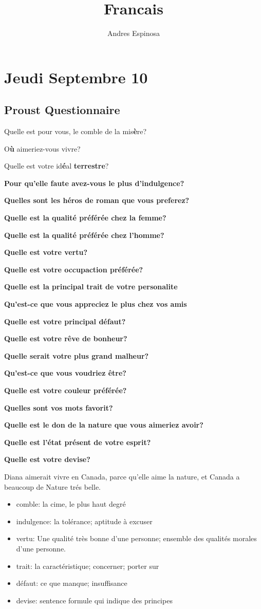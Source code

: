 \documentclass[11pt]{article}
\title{Francais}
\author{Andres Espinosa}
\begin{document}
\pgfplotsset{compat=1.18}
\maketitle

\tableofcontents
\section{Jeudi Septembre 10}
\subsection{Proust Questionnaire}

Quelle est pour vous, le comble de la mis\textbf{è}re?

O\textbf{ù} aimeriez-vous vivre?

Quelle est votre id\textbf{é}al \textbf{terrestre}?

\textbf{Pour qu'elle faute avez-vous le plus d'indulgence?}

\textbf{Quelles sont les héros de roman que vous preferez?}

\textbf{Quelle est la qualité préférée chez la femme?}

\textbf{Quelle est la qualité préférée chez l'homme?}

\textbf{Quelle est votre vertu?}

\textbf{Quelle est votre occupaction préférée?}

\textbf{Quelle est la principal trait de votre personalite} 

\textbf{Qu'est-ce que vous appreciez le plus chez vos amis} 

\textbf{Quelle est votre principal défaut?}

\textbf{Quelle est votre rêve de bonheur?}

\textbf{Quelle serait votre plus grand malheur?}

\textbf{Qu'est-ce que vous voudriez être?}

\textbf{Quelle est votre couleur préférée?}

\textbf{Quelles sont vos mots favorit?}

\textbf{Quelle est le don de la nature que vous aimeriez avoir?}

\textbf{Quelle est l'état présent de votre esprit?}

\textbf{Quelle est votre devise?}

Diana aimerait vivre en Canada, parce qu'elle aime la nature, et Canada a beaucoup de Nature trés belle.

\begin{itemize}
  \item comble: la cime, le plus haut degré
  \item indulgence: la tolérance; aptitude à excuser
  \item vertu: Une qualité très bonne d'une personne; ensemble des qualités morales d'une personne.
  \item trait: la caractéristique; concerner; porter sur
  \item défaut: ce que manque; insuffisance
  \item devise: sentence formule qui indique des principes
\end{itemize}
\end{document}

